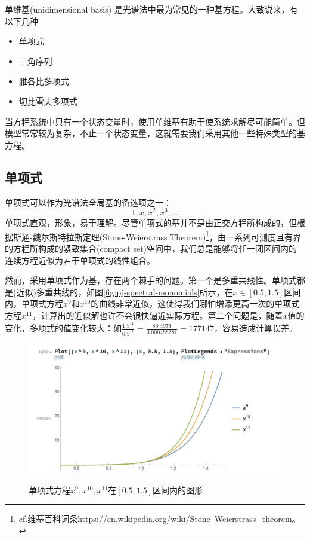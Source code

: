 单维基(unidimensional basis) 是光谱法中最为常见的一种基方程。大致说来，有以下几种
\begin{itemize}
  \item 单项式
  \item 三角序列
  \item 雅各比多项式
  \item 切比雪夫多项式
\end{itemize}

当方程系统中只有一个状态变量时，使用单维基有助于使系统求解尽可能简单。但模型常常较为复杂，不止一个状态变量，这就需要我们采用其他一些特殊类型的基方程。

\subsection{单项式}
\label{sec:pj-base-spectral-monomial}
单项式可以作为光谱法全局基的备选项之一：
\begin{equation*}
   1,x,x^2,x^3,\ldots
\end{equation*}
单项式直观，形象，易于理解。尽管单项式的基并不是由正交方程所构成的，但根据斯通-魏尔斯特拉斯定理(Stone-Weierstrass Theorem)\footnote{cf.维基百科词条\url{https://en.wikipedia.org/wiki/Stone–Weierstrass_theorem}。}，由一系列可测度且有界的方程所构成的紧致集合(compact set)空间中，我们总是能够将任一闭区间内的连续方程近似为若干单项式的线性组合。

然而，采用单项式作为基，存在两个棘手的问题。第一个是多重共线性。单项式都是(近似)多重共线的，如图\eqref{fig:pj-spectral-monomials}所示，在$x \in [0.5, 1.5]$区间内，单项式方程$x^9$和$x^10$的曲线非常近似，这使得我们哪怕增添更高一次的单项式方程$x^{11}$，计算出的近似解也许不会很快逼近实际方程。第二个问题是，随着$x$值的变化，多项式的值变化较大：如$\frac{1.5^{11}}{0.5^{11}} = \frac{86.4976}{0.000488281} = 177147$，容易造成计算误差。

\begin{figure}[htbp]
   \caption[单项式方程]{单项式方程$x^9,x^10,x^{11}$在$[0.5,1.5]$区间内的图形}
  \centering
  \includegraphics[width=12cm]{./Figures/20170917-monomial-mcl}
  \label{fig:pj-spectral-monomials}
%
\end{figure}



